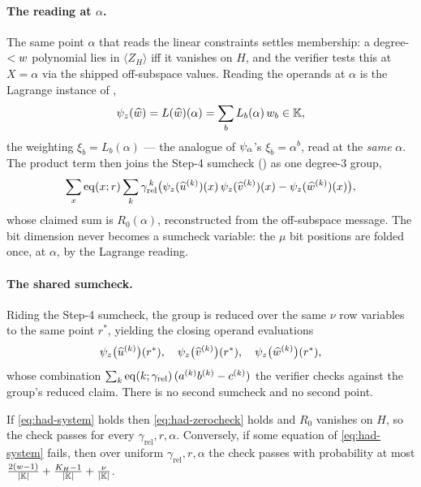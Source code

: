 \paragraph{The reading at $\alpha$.} The same point $\alpha$ that reads the
linear constraints settles membership: a degree-$<w$ polynomial lies in
$\langle Z_H\rangle$ iff it vanishes on $H$, and the verifier tests this at
$X = \alpha$ via the shipped off-subspace values. Reading the operands at
$\alpha$ is the Lagrange instance of ,
\[
  \psi_{z}(\widehat{w}) = L(\widehat{w})(\alpha) = \sum_b L_b(\alpha)\,w_b \in\mathbb{K} ,
\]
the weighting $\xi_b = L_b(\alpha)$ --- the analogue of $\psi_{\alpha}$'s
$\xi_b = \alpha^b$, read at the \emph{same} $\alpha$. The product term then joins
the Step-4 sumcheck () as one degree-$3$ group,
\[
  \sum_{x}\operatorname{eq}(x;r)\sum_k\gamma_{\mathrm{rel}}^{\,k}
  \bigl(\psi_{z}(\widehat{u}^{(k)})(x)\,\psi_{z}(\widehat{v}^{(k)})(x) - \psi_{z}(\widehat{w}^{(k)})(x)\bigr),
\]
whose claimed sum is $R_0(\alpha)$, reconstructed from the off-subspace message.
The bit dimension never becomes a sumcheck variable: the $\mu$ bit positions are
folded once, at $\alpha$, by the Lagrange reading.

\paragraph{The shared sumcheck.} Riding the Step-4 sumcheck, the group is reduced
over the same $\nu$ row variables to the same point $r^*$, yielding the closing
operand evaluations
\begin{equation}
  \label{eq:operand-evals}
  \psi_{z}\bigl(\widehat{u}^{(k)}\bigr)(r^*),\quad
  \psi_{z}\bigl(\widehat{v}^{(k)}\bigr)(r^*),\quad
  \psi_{z}\bigl(\widehat{w}^{(k)}\bigr)(r^*),
\end{equation}
whose combination
$\sum_k\operatorname{eq}(k;\gamma_{\mathrm{rel}})\,(a^{(k)}b^{(k)}-c^{(k)})$ the verifier checks
against the group's reduced claim. There is no second sumcheck and no second
point.

\begin{lemma}
\label{lem:psi-z-sound}
If \eqref{eq:had-system} holds then \eqref{eq:had-zerocheck} holds and $R_0$
vanishes on $H$, so the check passes for every $\gamma_{\mathrm{rel}},r,\alpha$.
Conversely, if some equation of \eqref{eq:had-system} fails, then over uniform
$\gamma_{\mathrm{rel}}, r, \alpha$ the check passes with probability at most
$\frac{2(w-1)}{|\mathbb{K}|}+\frac{K_H-1}{|\mathbb{K}|}+\frac{\nu}{|\mathbb{K}|}$.
\end{lemma}

